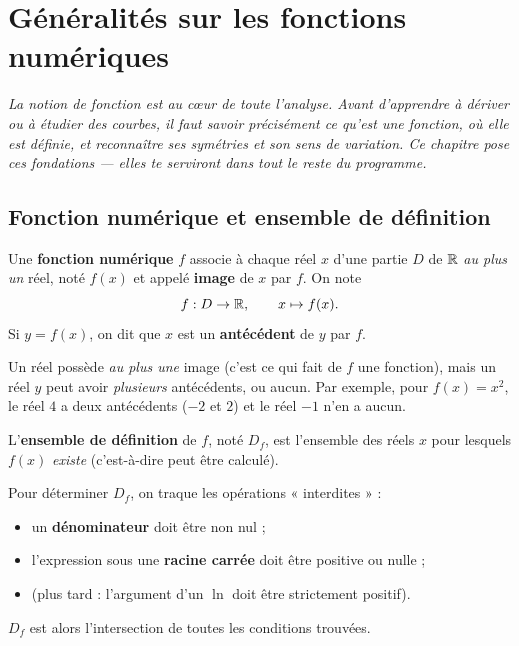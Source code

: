 \chapter{Généralités sur les fonctions numériques}
\textit{La notion de fonction est au cœur de toute l'analyse. Avant d'apprendre à
dériver ou à étudier des courbes, il faut savoir précisément ce qu'est une fonction,
où elle est définie, et reconnaître ses symétries et son sens de variation. Ce
chapitre pose ces fondations — elles te serviront dans tout le reste du programme.}

\section{Fonction numérique et ensemble de définition}

\begin{definition}
Une \textbf{fonction numérique} $f$ associe à chaque réel $x$ d'une partie $D$ de
$\mathbb{R}$ \emph{au plus un} réel, noté $f(x)$ et appelé \textbf{image} de $x$ par $f$. On note
\[ f : D \to \mathbb{R},\qquad x \mapsto f(x). \]
Si $y = f(x)$, on dit que $x$ est un \textbf{antécédent} de $y$ par $f$.
\end{definition}

\begin{remarque}
Un réel possède \emph{au plus une} image (c'est ce qui fait de $f$ une fonction),
mais un réel $y$ peut avoir \emph{plusieurs} antécédents, ou aucun. Par exemple, pour
$f(x)=x^2$, le réel $4$ a deux antécédents ($-2$ et $2$) et le réel $-1$ n'en a aucun.
\end{remarque}

\begin{definition}
L'\textbf{ensemble de définition} de $f$, noté $D_f$, est l'ensemble des réels $x$
pour lesquels $f(x)$ \emph{existe} (c'est-à-dire peut être calculé).
\end{definition}

\begin{aretenir}
Pour déterminer $D_f$, on traque les opérations « interdites » :
\begin{itemize}
  \item un \textbf{dénominateur} doit être non nul ;
  \item l'expression sous une \textbf{racine carrée} doit être positive ou nulle ;
  \item (plus tard : l'argument d'un $\ln$ doit être strictement positif).
\end{itemize}
$D_f$ est alors l'intersection de toutes les conditions trouvées.
\end{aretenir}

